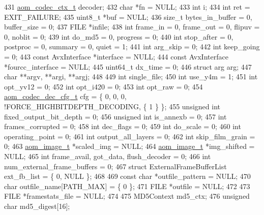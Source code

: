 \begin{DoxyCodeInclude}
{{{{{{{{{{{{{{{{{{{{{{{{{431   \hyperlink{structaom__codec__ctx}{aom\_codec\_ctx\_t} decoder;
432   \textcolor{keywordtype}{char} *fn = NULL;
433   \textcolor{keywordtype}{int} i;
434   \textcolor{keywordtype}{int} ret = EXIT\_FAILURE;
435   uint8\_t *buf = NULL;
436   \textcolor{keywordtype}{size\_t} bytes\_in\_buffer = 0, buffer\_size = 0;
437   FILE *infile;
438   \textcolor{keywordtype}{int} frame\_in = 0, frame\_out = 0, flipuv = 0, noblit = 0;
439   \textcolor{keywordtype}{int} do\_md5 = 0, progress = 0;
440   \textcolor{keywordtype}{int} stop\_after = 0, postproc = 0, summary = 0, quiet = 1;
441   \textcolor{keywordtype}{int} arg\_skip = 0;
442   \textcolor{keywordtype}{int} keep\_going = 0;
443   \textcolor{keyword}{const} AvxInterface *\textcolor{keyword}{interface }= NULL;
444   \textcolor{keyword}{const} AvxInterface *fourcc\_interface = NULL;
445   uint64\_t dx\_time = 0;
446   \textcolor{keyword}{struct }arg arg;
447   \textcolor{keywordtype}{char} **argv, **argi, **argj;
448 
449   \textcolor{keywordtype}{int} single\_file;
450   \textcolor{keywordtype}{int} use\_y4m = 1;
451   \textcolor{keywordtype}{int} opt\_yv12 = 0;
452   \textcolor{keywordtype}{int} opt\_i420 = 0;
453   \textcolor{keywordtype}{int} opt\_raw = 0;
454   \hyperlink{structaom__codec__dec__cfg}{aom\_codec\_dec\_cfg\_t} cfg = \{ 0, 0, 0, !FORCE\_HIGHBITDEPTH\_DECODING, \{ 1 \} \};
455   \textcolor{keywordtype}{unsigned} \textcolor{keywordtype}{int} fixed\_output\_bit\_depth = 0;
456   \textcolor{keywordtype}{unsigned} \textcolor{keywordtype}{int} is\_annexb = 0;
457   \textcolor{keywordtype}{int} frames\_corrupted = 0;
458   \textcolor{keywordtype}{int} dec\_flags = 0;
459   \textcolor{keywordtype}{int} do\_scale = 0;
460   \textcolor{keywordtype}{int} operating\_point = 0;
461   \textcolor{keywordtype}{int} output\_all\_layers = 0;
462   \textcolor{keywordtype}{int} skip\_film\_grain = 0;
463   \hyperlink{structaom__image}{aom\_image\_t} *scaled\_img = NULL;
464   \hyperlink{structaom__image}{aom\_image\_t} *img\_shifted = NULL;
465   \textcolor{keywordtype}{int} frame\_avail, got\_data, flush\_decoder = 0;
466   \textcolor{keywordtype}{int} num\_external\_frame\_buffers = 0;
467   \textcolor{keyword}{struct }ExternalFrameBufferList ext\_fb\_list = \{ 0, NULL \};
468 
469   \textcolor{keyword}{const} \textcolor{keywordtype}{char} *outfile\_pattern = NULL;
470   \textcolor{keywordtype}{char} outfile\_name[PATH\_MAX] = \{ 0 \};
471   FILE *outfile = NULL;
472 
473   FILE *framestats\_file = NULL;
474 
475   MD5Context md5\_ctx;
476   \textcolor{keywordtype}{unsigned} \textcolor{keywordtype}{char} md5\_digest[16];
}}}}}}}}}}}}}}}}}}}}}}}}}
\end{DoxyCodeInclude}
